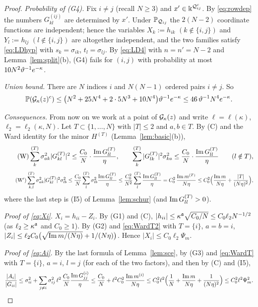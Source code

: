 \begin{proof}
\emph{Probability of \textup{(G4)}.} Fix $i\ne j$ (recall $N\ge3$) and $x'\in\Bbbk^{\mathcal Q_{ij}^c}$. By \eqref{eq:rowdep} the numbers $G^{(ij)}_{kl}$ are determined by $x'$. Under $\mathbb{P}_{\mathcal Q_{ij}}$ the $2(N-2)$ coordinate functions are independent; hence the variables
$X_k:=h_{ik}$ $(k\notin\{i,j\})$ and $Y_l:=h_{lj}$ $(l\notin\{i,j\})$ are altogether independent, and the two families satisfy \eqref{eq:LDhyp} with $s_k=\sigma_{ik}$, $t_l=\sigma_{lj}$. By \eqref{eq:LD4} with $n=n'=N-2$ and Lemma~\ref{lem:split}(b), (G4) fails for $(i,j)$ with probability at most $10N^2\vartheta^{-1}e^{-\kappa}$.

\emph{Union bound.} There are $N$ indices $i$ and $N(N-1)$ ordered pairs $i\ne j$. So
\[
 \mathbb{P}(\mathcal{G}_\kappa(z)^c)\le\big(N^2+25N^4+2\cdot5N^3+10N^4\big)\vartheta^{-1}e^{-\kappa}\le46\,\vartheta^{-1}N^4e^{-\kappa}.
\]

\emph{Consequences.} From now on we work at a point of $\mathcal{G}_\kappa(z)$ and write $\ell=\ell(\kappa)$, $\ell_2=\ell_2(\kappa,N)$. Let $T\subset\{1,\dots,N\}$ with $|T|\le2$ and $a,b\in T$. By (C) and the Ward identity for the minor $H^{(T)}$ (Lemma~\ref{lem:basic}(b)),
\begin{equation}\tag{W}\label{eq:WardT}
 \sum^{(T)}_{k}\sigma_{ak}^2|G^{(T)}_{kl}|^2\le\frac{C_0}N\cdot\frac{\operatorname{Im} G^{(T)}_{ll}}{\eta},\qquad\sum^{(T)}_{k}|G^{(T)}_{lk}|^2\sigma_{ka}^2\le\frac{C_0}N\cdot\frac{\operatorname{Im} G^{(T)}_{ll}}{\eta}\qquad(l\notin T),
\end{equation}
\begin{equation}\tag{W$'$}\label{eq:WardT2}
 \sum^{(T)}_{k,l}\sigma_{ak}^2|G^{(T)}_{kl}|^2\sigma_{lb}^2\le\frac{C_0}N\sum^{(T)}_l\sigma_{lb}^2\frac{\operatorname{Im} G^{(T)}_{ll}}\eta\le\frac{C_0^2}{N^2}\sum^{(T)}_l\frac{\operatorname{Im} G^{(T)}_{ll}}\eta=C_0^2\,\frac{\operatorname{Im} m^{(T)}}{N\eta}\le C_0^2\Big(\frac{\operatorname{Im} m}{N\eta}+\frac{|T|}{(N\eta)^2}\Big),
\end{equation}
where the last step is (I5) of Lemma~\ref{lem:schur} (and $\operatorname{Im} G^{(T)}_{ll}>0$).

\emph{Proof of \eqref{eq:Xi}.} $X_i=h_{ii}-Z_i$. By (G1) and (C), $|h_{ii}|\le\kappa^{\mathfrak{a}}\sqrt{C_0/N}\le C_0\ell_2N^{-1/2}$ (as $\ell_2\ge\kappa^{\mathfrak{a}}$ and $C_0\ge1$). By (G2) and \eqref{eq:WardT2} with $T=\{i\}$, $a=b=i$,
$|Z_i|\le\ell_2C_0\big(\sqrt{\operatorname{Im} m/(N\eta)}+1/(N\eta)\big)$. Hence $|X_i|\le C_0\ell_2\Psi_m$.

\emph{Proof of \eqref{eq:Ai}.} By the last formula of Lemma~\ref{lem:sce}, by (G3) and \eqref{eq:WardT} with $T=\{i\}$, $a=i$, $l=j$ (for each of the two factors), and then by (C) and (I5),
\[
 \frac{|A_i|}{|G_{ii}|}\le\sigma_{ii}^2+\sum_{j\ne i}\sigma_{ij}^2\,\ell^2\,\frac{C_0}N\frac{\operatorname{Im} G^{(i)}_{jj}}\eta\le\frac{C_0}N+\ell^2C_0^2\,\frac{\operatorname{Im} m^{(i)}}{N\eta}\le C_0^2\ell^2\Big(\frac1N+\frac{\operatorname{Im} m}{N\eta}+\frac1{(N\eta)^2}\Big)\le C_0^2\ell^2\Psi_m^2 .
\]


\end{proof}
